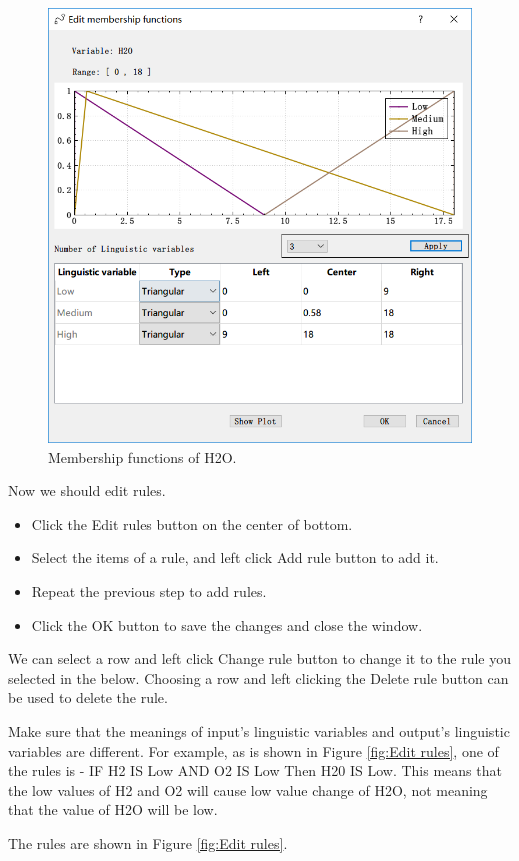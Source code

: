 \documentclass[journal,a4paper,onecolumn]{article}
\begin{document}
\begin{figure}[!hbt]
	\begin{center}
		\includegraphics[width=0.7\columnwidth]{fig9_2}
		\caption{Membership functions of H2O.}
		\label{fig:Membership functions of H2O}
	\end{center}
\end{figure}
\clearpage
Now we should edit rules.
\begin{itemize}
	\item Click the Edit rules button on the center of bottom.
	\item Select the items of a rule, and left click Add rule button to add it.
	\item Repeat the previous step to add rules.
	\item Click the OK button to save the changes and close the window.
\end{itemize}

We can select a row and left click Change rule button to change it to the rule you selected in the below. Choosing a row and left clicking the Delete rule button can be used to delete the rule.

Make sure that the meanings of input's linguistic variables and output's linguistic variables are different. For example, as is shown in Figure \ref{fig:Edit rules}, one of the rules is - IF H2 IS Low AND O2 IS Low Then H20 IS Low. This means that the low values of H2 and O2 will cause low value change of H2O, not meaning that the value of H2O will be low.

The rules are shown in Figure \ref{fig:Edit rules}.
\end{document}
